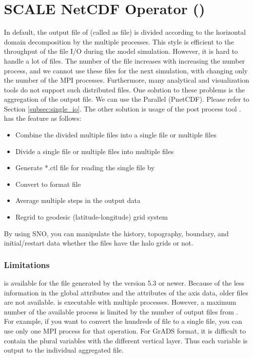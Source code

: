 \section{SCALE NetCDF Operator (\sno)} \label{sec:snoutil}

In default, the output file of \scalerm (called as \scalenetcdf file) is divided according to the horizontal domain decomposition by the multiple processes. This style is efficient to the throughput of the file I/O during the model simulation. However, it is hard to handle a lot of files. The number of the file increases with increasing the number process, and we cannot use these files for the next simulation, with changing only the number of the MPI processes. Furthermore, many analytical and visualization tools do not support such distributed files. One solution to these problems is the aggregation of the output file. We can use the Parallel \netcdf (PnetCDF). Please refer to Section \ref{subsec:single_io}. The other solution is usage of the post process tool \sno. \sno has the feature as follows:

\begin{itemize}
 \item Combine the divided multiple files into a single file or multiple files
 \item Divide a single file or multiple files into multiple files
 \item Generate *.ctl file for reading the single \Netcdf file by \grads
 \item Convert to \grads format file
 \item Average multiple steps in the output data
 \item Regrid to geodesic (latitude-longitude) grid system
\end{itemize}

By using SNO, you can manipulate the history, topography, boundary, and initial/restart data whether the files have the halo grids or not.

\subsubsection{Limitations}

\sno is available for the \scalenetcdf file generated by the \scalelib version 5.3 or newer. Because of the less information in the global attributes and the attributes of the axis data, older \scalenetcdf files are not available.
\sno is executable with multiple processes. However, a maximum number of the available process is limited by the number of output files from \sno. For example, if you want to convert the hundreds of \scalenetcdf file to a single file, you can use only one MPI process for that operation.
For GrADS format, it is difficult to contain the plural variables with the different vertical layer. Thus each variable is output to the individual aggregated file.

